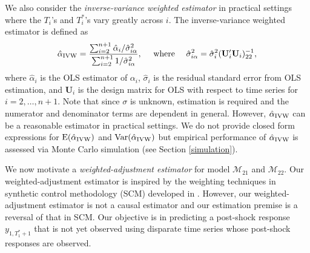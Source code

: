 \documentclass[11pt]{article}
\def\mbf#1{\mathbf{#1}} %
\def\mc#1{\mathcal{#1}} %
\def\E#1{\mathrm{E}(#1)} %
\def\var#1{\mathrm{Var}(#1)} %
\theoremstyle{definition}
\begin{document}
We also consider the \emph{inverse-variance weighted estimator} 
in practical settings where the $T_i$'s and $T_i^*$'s vary greatly across $i$. 
The inverse-variance weighted estimator is defined as 
\begin{align*}
  \hat{\alpha}_{\rm IVW} = \frac{\sum_{i=2}^{n+1} \hat{\alpha}_i / \hat{\sigma}_{i\alpha}^2}{\sum_{i=2}^{n+1} 1/\hat{\sigma}_{i\alpha}^2},
  \quad \text{ where } \quad  \hat{\sigma}_{i\alpha}^2 = \hat{\sigma}^2_i( \mathbf{U}_i'\mbf{U}_i)_{22}^{-1},
\end{align*}
where  $\hat{\alpha}_i$ is the OLS estimator of $\alpha_i$, 
$\hat{\sigma}_i$ is the residual standard error from OLS estimation, 
and $\mbf{U}_i$ is the design matrix for OLS with respect to time series 
for $i = 2, \ldots, n+1$. Note that since $\sigma$ is unknown, estimation 
is required and the numerator and denominator terms are dependent in general. 
However, $\hat{\alpha}_{\rm IVW}$ can be a reasonable estimator in 
practical settings. %
We do not provide closed form expressions for $\E{\hat{\alpha}_{\rm IVW}}$ 
and $\var{\hat{\alpha}_{\rm IVW}}$ but empirical performance of 
$\hat{\alpha}_{\rm IVW}$ is assessed via Monte Carlo simulation 
(see Section \ref{simulation}).

We now motivate a \emph{weighted-adjustment estimator} for model $\mc{M}_{21}$ 
and $\mc{M}_{22}$. Our weighted-adjustment estimator is inspired by the 
weighting techniques in synthetic control methodology (SCM) developed 
in \cite{abadie2010synthetic}. 
However, our weighted-adjustment estimator is not a causal estimator and 
our estimation premise is a reversal of that in SCM. 
Our objective is in predicting a post-shock response $y_{1,T_1^*+1}$ that is not yet 
observed using disparate time series whose post-shock responses are observed.
\end{document}

